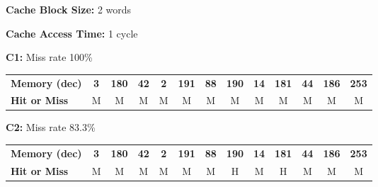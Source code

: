 \documentclass[fleqn]{article}
\begin{document}
\textbf{Cache Block Size:} 2 words

\textbf{Cache Access Time:} 1 cycle
\vspace{0.15in}

\textbf{C1:} Miss rate 100\%
\vspace{-0.1in}
\begin{table}[H]
    \setlength{\tabcolsep}{6pt}
    \fontsize{9pt}{12pt}\selectfont
    \begin{tabular}{l|c|c|c|c|c|c|c|c|c|c|c|c}
    \textbf{Memory (dec)} & \textbf{3} & \textbf{180} & \textbf{42} & \textbf{2} & \textbf{191} & \textbf{88} & \textbf{190} & \textbf{14} & \textbf{181} & \textbf{44} & \textbf{186} & \textbf{253} \\
    \textbf{Hit or Miss} & M & M & M & M & M & M & M & M & M & M & M & M \\
    \end{tabular}
\end{table}

\textbf{C2:} Miss rate 83.3\%
\vspace{-0.1in}
\begin{table}[H]
    \setlength{\tabcolsep}{6pt}
    \fontsize{9pt}{12pt}\selectfont
    \begin{tabular}{l|c|c|c|c|c|c|c|c|c|c|c|c}
    \textbf{Memory (dec)} & \textbf{3} & \textbf{180} & \textbf{42} & \textbf{2} & \textbf{191} & \textbf{88} & \textbf{190} & \textbf{14} & \textbf{181} & \textbf{44} & \textbf{186} & \textbf{253} \\ 
    \textbf{Hit or Miss} & M & M & M & M & M & M & H & M & H & M & M & M \\
    \end{tabular}
\end{table}
\end{document}
